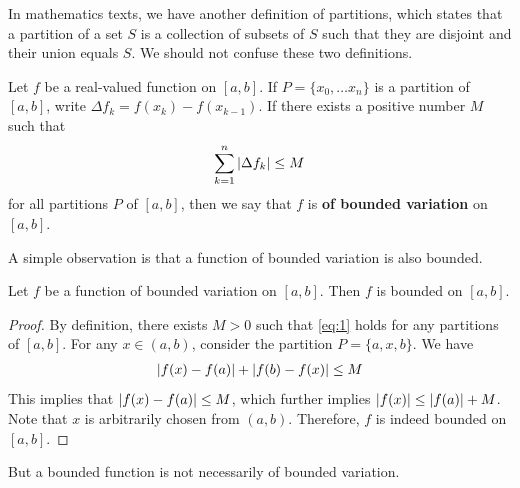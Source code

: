 \documentclass[thmcnt=section, color=blue, 12pt]{my-elegantbook}
\begin{document}
\begin{note}
	In mathematics texts, we have another definition of partitions,
	which states that a partition of a set $S$ is a collection of subsets of $S$
	such that they are disjoint and their union equals $S$.
	We should not confuse these two definitions.
\end{note}

\begin{definition}
	Let $f$ be a real-valued function on $[a, b]$.
	If $P = \{x_0, \dots x_n\}$ is a partition of $[a, b]$,
	write $\Delta f_k = f(x_k) - f(x_{k-1})$.
	If there exists a positive number $M$ such that
	\begin{align}
		\sum_{k=1}^n \left\lvert \Delta f_k \right\rvert \leq M \label{eq:1}
	\end{align}
	for all partitions $P$ of $[a, b]$, then we say that $f$
	is \textbf{of bounded variation}
	on $[a, b]$.
\end{definition}

A simple observation is that a function of bounded variation is also bounded.

\begin{proposition} \label{prop:2}
	Let $f$ be a function of bounded variation on $[a, b]$.
	Then $f$ is bounded on $[a, b]$.
\end{proposition}

\begin{proof}
	By definition, there exists $M > 0$ such that \eqref{eq:1} holds
	for any partitions of $[a, b]$.
	For any $x \in (a, b)$, consider the partition $P = \{a, x, b\}$.
	We have
	\begin{align*}
		\left\lvert f(x) - f(a) \right\rvert + \left\lvert f(b) - f(x) \right\rvert \leq M
	\end{align*}
	This implies that $\left\lvert f(x) - f(a) \right\rvert \leq M$, which further
	implies $\left\lvert f(x) \right\rvert \leq \left\lvert f(a) \right\rvert + M$.
	Note that $x$ is arbitrarily chosen from $(a, b)$.
	Therefore, $f$ is indeed bounded on $[a, b]$.
\end{proof}

But a bounded function is not necessarily of bounded variation.
\end{document}
